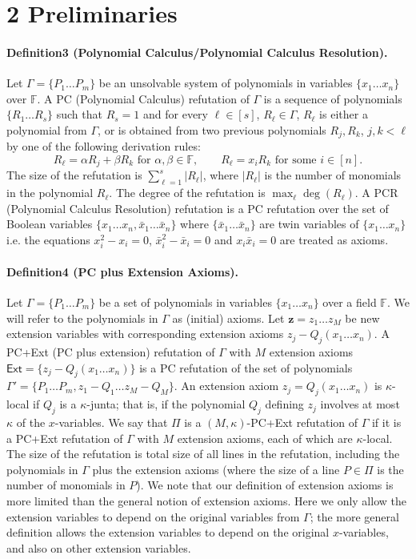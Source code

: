 \section*{2 Preliminaries}
\paragraph{Definition3 (Polynomial Calculus/Polynomial Calculus Resolution).}
Let $\Gamma=\{P_1\ldots P_m\}$ be an unsolvable system of polynomials in variables $\{x_1\ldots x_n\}$ over $\mathbb F$. A PC (Polynomial Calculus) refutation of $\Gamma$ is a sequence of polynomials $\{R_1\ldots R_s\}$ such that $R_s=1$ and for every $\ell\in[s]$, $R_{\ell}\in\Gamma$, $R_{\ell}$ is either a polynomial from $\Gamma$, or is obtained from two previous polynomials $R_j,R_k$, $j,k<\ell$ by one of the following derivation rules:
\[R_{\ell}=\alpha R_j+\beta R_k\text{ for }\alpha,\beta\in\mathbb F,\qquad R_{\ell}=x_iR_k\text{ for some }i\in[n].\]
The size of the refutation is $\sum_{\ell=1}^s|R_{\ell}|$, where $|R_{\ell}|$ is the number of monomials in the polynomial $R_{\ell}$. The degree of the refutation is $\max_{\ell}\deg(R_{\ell})$.
A PCR (Polynomial Calculus Resolution) refutation is a PC refutation over the set of Boolean variables $\{x_1\ldots x_n,\bar x_1\ldots\bar x_n\}$ where $\{\bar x_1\ldots\bar x_n\}$ are twin variables of $\{x_1\ldots x_n\}$ i.e. the equations $x_i^2-x_i=0$, $\bar x_i^2-\bar x_i=0$ and $x_i\bar x_i=0$ are treated as axioms.
\paragraph{Definition4 (PC plus Extension Axioms).}
Let $\Gamma=\{P_1\ldots P_m\}$ be a set of polynomials in variables $\{x_1\ldots x_n\}$ over a field $\mathbb F$. We will refer to the polynomials in $\Gamma$ as (initial) axioms. Let $\mathbf z=z_1\ldots z_M$ be new extension variables with corresponding extension axioms $z_j-Q_j(x_1\ldots x_n)$. A PC+Ext (PC plus extension) refutation of $\Gamma$ with $M$ extension axioms $\mathsf{Ext}=\{z_j-Q_j(x_1\ldots x_n)\}$ is a PC refutation of the set of polynomials $\Gamma'=\{P_1\ldots P_m,z_1-Q_1\ldots z_M-Q_M\}$. An extension axiom $z_j=Q_j(x_1\ldots x_n)$ is $\kappa$-local if $Q_j$ is a $\kappa$-junta; that is, if the polynomial $Q_j$ defining $z_j$ involves at most $\kappa$ of the $x$-variables. We say that $\Pi$ is a $(M,\kappa)$-PC+Ext refutation of $\Gamma$ if it is a PC+Ext refutation of $\Gamma$ with $M$ extension axioms, each of which are $\kappa$-local. The size of the refutation is total size of all lines in the refutation, including the polynomials in $\Gamma$ plus the extension axioms (where the size of a line $P\in\Pi$ is the number of monomials in $P$).
We note that our definition of extension axioms is more limited than the general notion of extension axioms. Here we only allow the extension variables to depend on the original variables from $\Gamma$; the more general definition allows the extension variables to depend on the original $x$-variables, and also on other extension variables.
